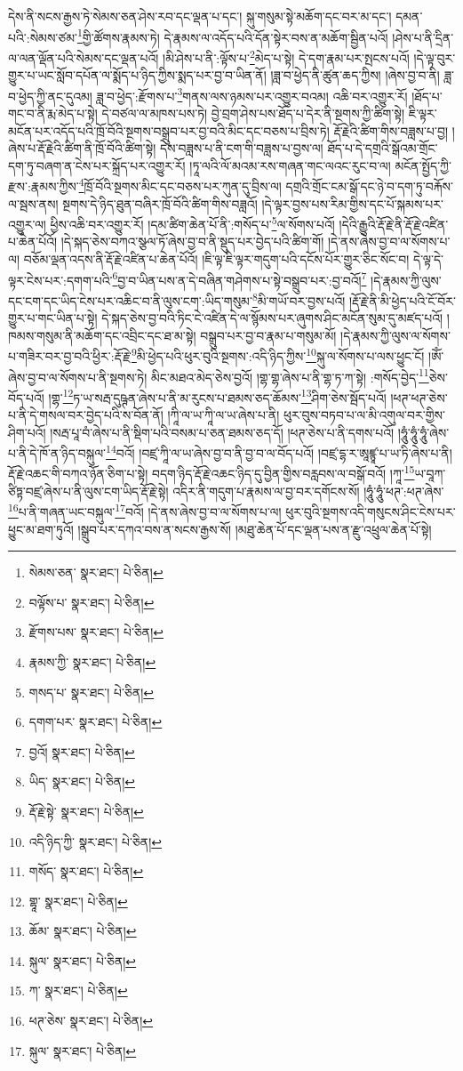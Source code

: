 དེས་ནི་སངས་རྒྱས་ཏེ་སེམས་ཅན་ཤེས་རབ་དང་ལྡན་པ་དང་། སྐུ་གསུམ་སྟེ་མཆོག་དང་བར་མ་དང་། དམན་པའི་:སེམས་ཙམ་\footnote{སེམས་ཅན་  སྣར་ཐང་།  པེ་ཅིན། }གྱི་ཚོགས་རྣམས་ཏེ། དེ་རྣམས་ལ་འདོད་པའི་དོན་སྟེར་བས་ན་མཆོག་སྦྱིན་པའོ། །ཤེས་པ་ནི་དྲིན་ལ་ལན་ལྡོན་པའི་སེམས་དང་ལྡན་པའོ། །མི་ཤེས་པ་ནི་:ལྟོས་པ་\footnote{བལྟོས་པ་  སྣར་ཐང་།  པེ་ཅིན། }མེད་པ་སྟེ། དེ་དག་རྣམ་པར་སྤངས་པའོ། །དེ་ལྟ་བུར་གྱུར་པ་ཡང་སློབ་དཔོན་ལ་སྨོད་པ་ཉིད་ཀྱིས་སྨད་པར་བྱ་བ་ཡིན་ནོ། །ཟླ་བ་ཕྱེད་ནི་ཚུན་ཆད་ཀྱིས། །ཞེས་བྱ་བ་ནི། ཟླ་བ་ཕྱེད་ཀྱི་ནང་དུའམ། ཟླ་བ་ཕྱེད་:རྫོགས་པ་\footnote{རྫོགས་པས་  སྣར་ཐང་།  པེ་ཅིན། }གནས་ལས་ཉམས་པར་འགྱུར་བའམ། འཆི་བར་འགྱུར་རོ། །ཐོད་པ་གང་བ་ནི་རྨ་མེད་པ་སྟེ། དེ་བཙལ་ལ་མཁས་པས་ཏེ། བྱེ་བྲག་ཤེས་པས་ཐོད་པ་དེར་ནི་སྔགས་ཀྱི་ཚིག་སྟེ། ཇི་ལྟར་མངོན་པར་འདོད་པའི་ཁྲོ་བོའི་སྔགས་བསྒྲུབ་པར་བྱ་བའི་མིང་དང་བཅས་པ་བྲིས་ཏེ། རྡོ་རྗེའི་ཚིག་གིས་བཟླས་པ་བྱ། །ཞེས་པ་རྡོ་རྗེའི་ཚིག་ནི་ཁྲོ་བོའི་ཚིག་སྟེ། དེས་བཟླས་པ་ནི་ངག་གི་བཟླས་པ་བྱས་ལ། ཐོད་པ་དེ་དགྲའི་སྒོའམ་གྲོང་དག་ཏུ་བཞག་ན་ངེས་པར་སྐྲོད་པར་འགྱུར་རོ། །ཏཱ་ལའི་ལོ་མའམ་རས་གཞན་གང་ལའང་རུང་བ་ལ། མངོན་སྤྱོད་ཀྱི་རྫས་:རྣམས་ཀྱིས་\footnote{རྣམས་ཀྱི་  སྣར་ཐང་།  པེ་ཅིན། }ཁྲོ་བོའི་སྔགས་མིང་དང་བཅས་པར་ཀུན་དུ་བྲིས་ལ། དགྲའི་གྲོང་ངམ་སྒོ་དང་ཉེ་བ་དག་ཏུ་བརྐོས་ལ་སྦས་ནས། སྔགས་དེ་ཉིད་ཐུན་བཞིར་ཁྲོ་བོའི་ཚིག་གིས་བཟླའོ། །དེ་ལྟར་བྱས་པས་རིམ་གྱིས་དང་པོ་སྐམས་པར་འགྱུར་ལ། ཕྱིས་འཆི་བར་འགྱུར་རོ། །དམ་ཚིག་ཆེན་པོ་ནི་:གསོད་པ་\footnote{གསད་པ་  སྣར་ཐང་།  པེ་ཅིན། }ལ་སོགས་པའོ། །དེའི་རྒྱུའི་རྡོ་རྗེ་ནི་རྡོ་རྗེ་འཛིན་པ་ཆེན་པོའོ། །དེ་སྐད་ཅེས་བཀའ་སྩལ་ཏོ་ཞེས་བྱ་བ་ནི་སྡུད་པར་བྱེད་པའི་ཚིག་གོ། །དེ་ནས་ཞེས་བྱ་བ་ལ་སོགས་པ་ལ། བཅོམ་ལྡན་འདས་ནི་རྡོ་རྗེ་འཛིན་པ་ཆེན་པོའོ། །ཇི་ལྟ་ཇི་ལྟར་གདུག་པའི་དངོས་པོར་གྱུར་ཅིང་སོང་བ། དེ་ལྟ་དེ་ལྟར་ངེས་པར་:དགག་པའི་\footnote{དགག་པར་  སྣར་ཐང་།  པེ་ཅིན། }བྱ་བ་ཡིན་པས་ན་དེ་བཞིན་གཤེགས་པ་སྟེ་བསྒྲུབ་པར་:བྱ་བའོ།\footnote{བྱའོ།  སྣར་ཐང་།  པེ་ཅིན། } །དེ་རྣམས་ཀྱི་ལུས་དང་ངག་དང་ཡིད་ངེས་པར་འཆིང་བ་ནི་ལུས་ངག་:ཡིད་གསུམ་\footnote{ཡིད་  སྣར་ཐང་།  པེ་ཅིན། }མི་གཡོ་བར་བྱས་པའོ། །རྡོ་རྗེ་ནི་མི་ཕྱེད་པའི་ངོ་བོར་གྱུར་པ་གང་ཡིན་པ་སྟེ། དེ་སྐད་ཅེས་བྱ་བའི་ཏིང་ངེ་འཛིན་དེ་ལ་སྙོམས་པར་ཞུགས་ཤིང་མངོན་སུམ་དུ་མཛད་པའོ། །ཁམས་གསུམ་ནི་མཆོག་དང་འབྲིང་དང་ཐ་མ་སྟེ། བསྒྲུབ་པར་བྱ་བ་རྣམ་པ་གསུམ་མོ། །དེ་རྣམས་ཀྱི་ལུས་ལ་སོགས་པ་གཟིར་བར་བྱ་བའི་ཕྱིར་:རྡོ་རྗེ་\footnote{རྡོ་རྗེ་སྟེ་  སྣར་ཐང་།  པེ་ཅིན། }མི་ཕྱེད་པའི་ཕུར་བུའི་སྔགས་:འདི་ཉིད་ཀྱིས་\footnote{འདི་ཉིད་ཀྱི་  སྣར་ཐང་།  པེ་ཅིན། }སྐུ་ལ་སོགས་པ་ལས་ཕྱུང་ངོ། །ཨོཾ་ཞེས་བྱ་བ་ལ་སོགས་པ་ནི་སྔགས་ཏེ། མིང་མཐའ་མེད་ཅེས་བྱའོ། །གྷ་གྷ་ཞེས་པ་ནི་གྷ་ཏ་ཀ་སྟེ། :གསོད་བྱེད་\footnote{གསོད་  སྣར་ཐང་།  པེ་ཅིན། }ཅེས་བོད་པའོ། །གྷ་\footnote{གྷཱ་  སྣར་ཐང་།  པེ་ཅིན། }ཏ་ཡ་སརྦ་དུཥྚན་ཞེས་པ་ནི་མ་རུངས་པ་ཐམས་ཅད་ཆོམས་\footnote{ཆོམ་  སྣར་ཐང་།  པེ་ཅིན། }ཤིག་ཅེས་སྦོད་པའོ། །ཕཊ་ཕཊ་ཅེས་པ་ནི་དེ་གསལ་བར་བྱེད་པའི་ས་བོན་ནོ། །ཀཱི་ལ་ཡ་ཀཱི་ལ་ཡ་ཞེས་པ་ནི། ཕུར་བུས་བཏབ་པ་ལ་མི་འགུལ་བར་གྱིས་ཤིག་པའོ། །སརྦ་པཱ་བཾ་ཞེས་པ་ནི་སྡིག་པའི་བསམ་པ་ཅན་ཐམས་ཅད་དོ། །ཕཊ་ཅེས་པ་ནི་དགས་པའོ། །ཧཱུཾ་ཧཱུཾ་ཧཱུཾ་ཞེས་པ་ནི་དེ་ཁོ་ན་ཉིད་བསྐུལ་\footnote{སྐུལ་  སྣར་ཐང་།  པེ་ཅིན། }བའོ། །བཛྲ་ཀཱི་ལ་ཡ་ཞེས་བྱ་བ་ནི་བྱ་བ་ལ་བོད་པའོ། །བཛྲ་དྷ་ར་ཨཱཛྙཱ་པ་ཡ་ཏི་ཞེས་པ་ནི། རྡོ་རྗེ་འཆང་གི་བཀའ་ཉོན་ཅིག་པ་སྟེ། བདག་ཉིད་རྡོ་རྗེ་འཆང་ཉིད་དུ་བྱིན་གྱིས་བརླབས་ལ་བསྒོ་བའོ། །ཀཱ་\footnote{ཀ་  སྣར་ཐང་།  པེ་ཅིན། }ཡ་བཱཀ་ཙིཏྟ་བཛྲ་ཞེས་པ་ནི་ལུས་ངག་ཡིད་རྡོ་རྗེ་སྟེ། འདིར་ནི་གདུག་པ་རྣམས་ལ་བྱ་བར་དགོངས་སོ། །ཧཱུཾ་ཧཱུཾ་ཕཊ་:ཕཊ་ཞེས་\footnote{ཕཊ་ཅེས་  སྣར་ཐང་།  པེ་ཅིན། }པ་ནི་གཞན་ཡང་བསྐུལ་\footnote{སྐུལ་  སྣར་ཐང་།  པེ་ཅིན། }བའོ། །དེ་ནས་ཞེས་བྱ་བ་ལ་སོགས་པ་ལ། ཕུར་བུའི་སྔགས་འདི་གསུངས་ཤིང་ངེས་པར་ཕྱུང་མ་ཐག་ཏུའོ། །སྒྲུབ་པར་དཀའ་བས་ན་སངས་རྒྱས་སོ། །མཐུ་ཆེན་པོ་དང་ལྡན་པས་ན་རྫུ་འཕྲུལ་ཆེན་པོ་སྟེ། 